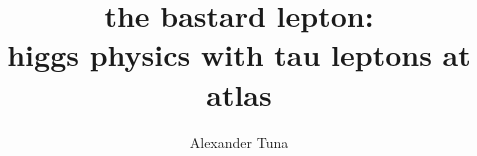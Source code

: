 \title{the bastard lepton:\\ higgs physics with tau leptons at atlas}
    
\author{Alexander Tuna}

\newcommand{\adviser}{H.H. Williams, Professor, Physics}
\newcommand{\advisershort}{H.H. Williams}
\newcommand{\myinstitution}{The University of Pennsylvania}
\newcommand{\chairperson}{Marija Drndic, Professor, Physics}

\newcommand{\committeeOne}{I. Joseph Kroll, Professor, Physics}
\newcommand{\committeeTwo}{Elliot Lipeles, Assistant Professor, Physics}
\newcommand{\committeeThree}{Burt Ovrut, Professor, Physics}
\newcommand{\committeeFour}{Philip Nelson, Professor, Physics}



